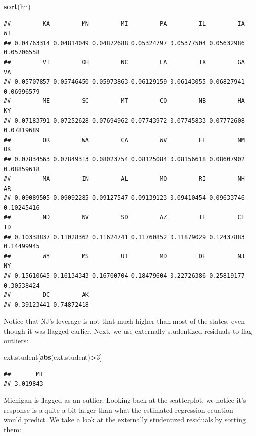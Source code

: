 \documentclass[
]{book}
\newenvironment{Shaded}{\begin{snugshade}}{\end{snugshade}}
\newcommand{\DecValTok}[1]{\textcolor[rgb]{0.00,0.00,0.81}{#1}}
\newcommand{\FunctionTok}[1]{\textcolor[rgb]{0.13,0.29,0.53}{\textbf{#1}}}
\newcommand{\NormalTok}[1]{#1}
\newcommand{\SpecialCharTok}[1]{\textcolor[rgb]{0.81,0.36,0.00}{\textbf{#1}}}
\begin{document}
\begin{Shaded}
\begin{Highlighting}[]
\FunctionTok{sort}\NormalTok{(hii)}
\end{Highlighting}
\end{Shaded}

\begin{verbatim}
##         KA         MN         MI         PA         IL         IA         WI 
## 0.04763314 0.04814049 0.04872688 0.05324797 0.05377504 0.05632986 0.05706558 
##         VT         OH         NC         LA         TX         GA         VA 
## 0.05707857 0.05746450 0.05973863 0.06129159 0.06143055 0.06827941 0.06996579 
##         ME         SC         MT         CO         NB         HA         KY 
## 0.07183791 0.07252628 0.07694962 0.07743972 0.07745833 0.07772608 0.07819689 
##         OR         WA         CA         WV         FL         NM         OK 
## 0.07834563 0.07849313 0.08023754 0.08125084 0.08156618 0.08607902 0.08859618 
##         MA         IN         AL         MO         RI         NH         AR 
## 0.09089505 0.09092285 0.09127547 0.09139123 0.09410454 0.09633746 0.10245416 
##         ND         NV         SD         AZ         TE         CT         ID 
## 0.10338837 0.11028362 0.11624741 0.11760852 0.11879029 0.12437883 0.14499945 
##         WY         MS         UT         MD         DE         NJ         NY 
## 0.15610645 0.16134343 0.16700704 0.18479604 0.22726386 0.25819177 0.30538424 
##         DC         AK 
## 0.39123441 0.74872418
\end{verbatim}

Notice that NJ's leverage is not that much higher than most of the states, even though it was flagged earlier. Next, we use externally studentized residuals to flag outliers:

\begin{Shaded}
\begin{Highlighting}[]
\NormalTok{ext.student[}\FunctionTok{abs}\NormalTok{(ext.student)}\SpecialCharTok{\textgreater{}}\DecValTok{3}\NormalTok{]}
\end{Highlighting}
\end{Shaded}

\begin{verbatim}
##       MI 
## 3.019843
\end{verbatim}

Michigan is flagged as an outlier. Looking back at the scatterplot, we notice it's response is a quite a bit larger than what the estimated regression equation would predict. We take a look at the externally studentized residuals by sorting them:
\end{document}
